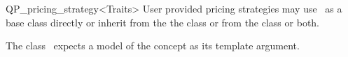 \begin{ccRefClass}{QP_pricing_strategy<Traits>}
User provided pricing strategies may use \ccRefName\ as a base class directly
or inherit from the the class  or from the class
 or both.   
   



\ccRequirements
\ccIndexRequirements

The class \ccRefName\ expects a model of the concept
 as its template argument.


\ccTypes \ccIndexClassTypes




\ccCreation
\ccIndexClassCreation
{}


\ccUnchecked

\ccAccessFunctions
\begin{ccIndexMemberFunctions}








\ccModifiers
{}



\end{ccIndexMemberFunctions}
\end{ccRefClass}
